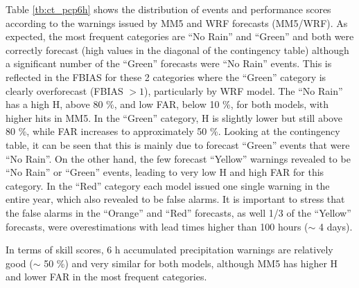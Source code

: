 Table \ref{tb:ct_pcp6h} shows the distribution of events and performance scores according to the warnings issued by MM5 and WRF forecasts (MM5/WRF). As expected, the most frequent categories are “No Rain” and “Green” and both were correctly forecast (high values in the diagonal of the contingency table) although a significant number of the “Green” forecasts were “No Rain” events. This is reflected in the FBIAS for these 2 categories where the “Green” category is clearly overforecast (FBIAS $> 1$), particularly by WRF model. The “No Rain” has a high H, above 80 \%, and low FAR, below 10 \%, for both models, with higher hits in MM5. In the “Green” category, H is slightly lower but still above 80 \%, while FAR increases to approximately 50 \%. Looking at the contingency table, it can be seen that this is mainly due to forecast “Green” events that were “No Rain”.  On the other hand, the few forecast “Yellow” warnings revealed to be “No Rain” or “Green” events, leading to very low H and high FAR for this category.  In the “Red” category each model issued one single warning in the entire year, which also revealed to be false alarms.  It is important to stress that the false alarms in the “Orange” and “Red” forecasts, as well 1/3 of the “Yellow” forecasts, were overestimations with lead times higher than 100 hours ($\sim$ 4 days). 

In terms of skill scores, 6 h accumulated precipitation warnings are relatively good ($\sim$ 50 \%) and very similar for both models, although MM5 has higher H and lower FAR in the most frequent categories.

